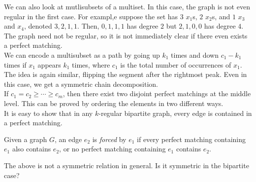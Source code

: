 
	We can also look at mutlisubsets of a multiset. In this case, the graph is not even regular in the first case. For exampl,e suppose the set has $3$ $x_1$s, $2$ $x_2$s, and $1$ $x_3$ and $x_4$, denoted $3,2,1,1$. Then, $0,1,1,1$ has degree $2$ but $2,1,0,0$ has degree $4$. The graph need not be regular, so it is not immediately clear if there even exists a perfect matching.\\
	We can encode a multisubset as a path by going up $k_1$ times and down $c_1-k_1$ times if $x_1$ appears $k_1$ times, where $c_1$ is the total number of occurrences of $x_1$. The idea is again similar, flipping the segment after the rightmost peak. Even in this case, we get a symmetric chain decomposition. \\
	If $c_1 = c_2 \ge \cdots \ge c_m$, then there exist two disjoint perfect matchings at the middle level. This can be proved by ordering the elements in two different ways.\\

	It is easy to show that in any $k$-regular bipartite graph, every edge is contained in a perfect matching.

	\begin{fdef}
		Given a graph $G$, an edge $e_2$ is \emph{forced} by $e_1$ if every perfect matching containing $e_1$ also contains $e_2$, or no perfect matching containing $e_1$ contains $e_2$.
	\end{fdef}

	The above is not a symmetric relation in general. Is it symmetric in the bipartite case?


